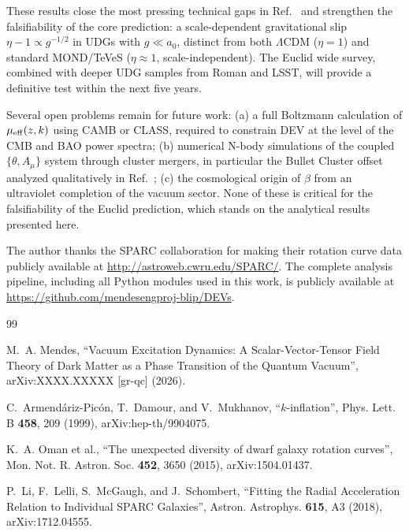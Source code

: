 \documentclass[aps,prd,reprint,floatfix,nofootinbib,superscriptaddress]{revtex4-2}
\newcommand{\aO}{a_0}
\newcommand{\mueff}{\mu_{\rm eff}}
\begin{document}
These results close the most pressing technical gaps in
Ref.~\cite{Mendes2026} and strengthen the falsifiability of the
core prediction: a scale-dependent gravitational slip
$\eta-1 \propto g^{-1/2}$ in UDGs with $g\ll\aO$, distinct from
both $\Lambda$CDM ($\eta=1$) and standard MOND/TeVeS
($\eta\approx 1$, scale-independent). The Euclid wide survey,
combined with deeper UDG samples from Roman and LSST, will provide
a definitive test within the next five years.

Several open problems remain for future work: (a) a full
Boltzmann calculation of $\mueff(z,k)$ using CAMB or CLASS,
required to constrain DEV at the level of the CMB and BAO
power spectra; (b) numerical N-body simulations of the coupled
$\{\theta,A_\mu\}$ system through cluster mergers, in particular
the Bullet Cluster offset analyzed qualitatively in
Ref.~\cite{Mendes2026}; (c) the cosmological origin of $\beta$
from an ultraviolet completion of the vacuum sector. None of
these is critical for the falsifiability of the Euclid prediction,
which stands on the analytical results presented here.

\begin{acknowledgments}
The author thanks the SPARC collaboration for making their
rotation curve data publicly available at
\url{http://astroweb.cwru.edu/SPARC/}. The complete analysis
pipeline, including all Python modules used in this work, is
publicly available at
\url{https://github.com/mendesengproj-blip/DEVs}.
\end{acknowledgments}

\begin{thebibliography}{99}

M.~A. Mendes, ``Vacuum Excitation Dynamics: A Scalar-Vector-Tensor
Field Theory of Dark Matter as a Phase Transition of the Quantum
Vacuum'', arXiv:XXXX.XXXXX [gr-qc] (2026).

C.~Armend\'ariz-Pic\'on, T.~Damour, and V.~Mukhanov,
``$k$-inflation'',
Phys. Lett. B \textbf{458}, 209 (1999), arXiv:hep-th/9904075.

K.~A. Oman et al.,
``The unexpected diversity of dwarf galaxy rotation curves'',
Mon. Not. R. Astron. Soc. \textbf{452}, 3650 (2015),
arXiv:1504.01437.

P.~Li, F.~Lelli, S.~McGaugh, and J.~Schombert,
``Fitting the Radial Acceleration Relation to Individual SPARC
Galaxies'',
Astron. Astrophys. \textbf{615}, A3 (2018), arXiv:1712.04555.

\end{thebibliography}
\end{document}

